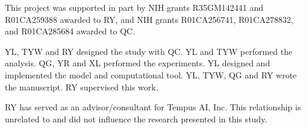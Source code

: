 \documentclass[pdflatex,sn-nature, lineno]{sn-jnl}%
\begin{document}

This project was supported in part by NIH grants R35GM142441 and R01CA259388 awarded to RY, and NIH grants R01CA256741, R01CA278832, and R01CA285684 awarded to QC.


YL, TYW and RY designed the study with QC. YL and TYW performed the analysis. QG, YR and XL performed the experiments. YL designed and implemented the model and computational tool. YL, TYW, QG and RY wrote the manuscript. RY supervised this work.


RY has served as an advisor/consultant for Tempus AI, Inc. This relationship is unrelated to and did not influence the research presented in this study.

\backmatter

\begin{appendices}
	\printglossaries
\end{appendices}
\end{document}
